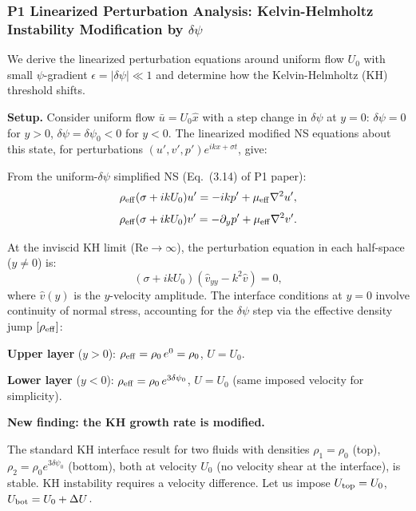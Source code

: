\documentclass[11pt,twocolumn]{article}
\newcommand{\dpsi}{\delta\psi}
\newcommand{\Rey}{\mathrm{Re}}
\begin{document}
\subsubsection{P1 Linearized Perturbation Analysis: Kelvin-Helmholtz
  Instability Modification by $\delta\psi$}
\label{sec:kh}

We derive the linearized perturbation equations around uniform flow $U_0$
with small $\psi$-gradient $\epsilon = |\dpsi| \ll 1$ and determine how
the Kelvin-Helmholtz (KH) threshold shifts.

\textbf{Setup.} Consider uniform flow $\bar{u} = U_0\hat{x}$ with a
step change in $\dpsi$ at $y = 0$: $\dpsi = 0$ for $y > 0$,
$\dpsi = \dpsi_0 < 0$ for $y < 0$. The linearized modified NS equations
about this state, for perturbations $(u', v', p')e^{ik x + \sigma t}$, give:

From the uniform-$\dpsi$ simplified NS (Eq.~(3.14) of P1 paper):
\begin{equation}
\rho_{\rm eff}(\sigma + ikU_0)u' = -ikp' + \mu_{\rm eff}\nabla^2 u',
\label{eq:lin_ns_x}
\end{equation}
\begin{equation}
\rho_{\rm eff}(\sigma + ikU_0)v' = -\partial_y p' + \mu_{\rm eff}\nabla^2 v'.
\label{eq:lin_ns_y}
\end{equation}

At the inviscid KH limit ($\Rey \to \infty$), the perturbation equation
in each half-space ($y \neq 0$) is:
\begin{equation}
(\sigma + ikU_0)(\hat{v}_{yy} - k^2\hat{v}) = 0,
\label{eq:rayleigh}
\end{equation}
where $\hat{v}(y)$ is the $y$-velocity amplitude. The interface conditions
at $y = 0$ involve continuity of normal stress, accounting for the
$\dpsi$ step via the effective density jump $[\rho_{\rm eff}]$:

\textbf{Upper layer} ($y > 0$): $\rho_{\rm eff} = \rho_0\,e^0 = \rho_0$,
$U = U_0$.

\textbf{Lower layer} ($y < 0$): $\rho_{\rm eff} = \rho_0\,e^{3\dpsi_0}$,
$U = U_0$ (same imposed velocity for simplicity).

\textbf{New finding: the KH growth rate is modified.}

The standard KH interface result for two fluids with densities
$\rho_1 = \rho_0$ (top), $\rho_2 = \rho_0 e^{3\dpsi_0}$ (bottom),
both at velocity $U_0$ (no velocity shear at the interface), is stable.
KH instability requires a velocity difference. Let us impose
$U_{\rm top} = U_0$, $U_{\rm bot} = U_0 + \Delta U$.
\end{document}
